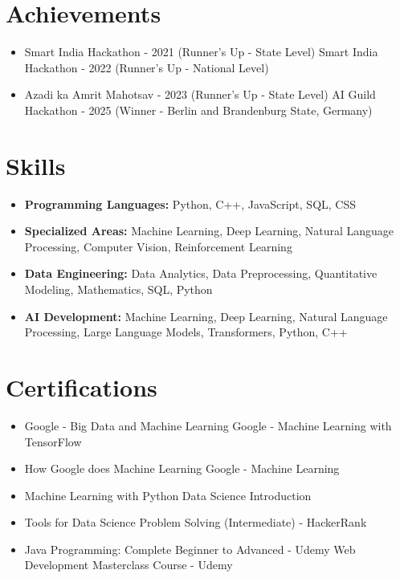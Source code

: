 \documentclass[a4paper,10pt]{article}
\begin{document}
\section*{Achievements}
\begin{itemize}
\item Smart India Hackathon - 2021 (Runner's Up - State Level) \hfill Smart India Hackathon - 2022 (Runner's Up - National Level)
\item Azadi ka Amrit Mahotsav - 2023 (Runner's Up - State Level) \hfill AI Guild Hackathon - 2025 (Winner - Berlin and Brandenburg State, Germany)
\end{itemize}

\section*{Skills}
\begin{itemize}
  \item \textbf{Programming Languages:} Python, C++, JavaScript, SQL, CSS
  \item \textbf{Specialized Areas:} Machine Learning, Deep Learning, Natural Language Processing, Computer Vision, Reinforcement Learning
  \item \textbf{Data Engineering:} Data Analytics, Data Preprocessing, Quantitative Modeling, Mathematics, SQL, Python
  \item \textbf{AI Development:} Machine Learning, Deep Learning, Natural Language Processing, Large Language Models, Transformers, Python, C++
\end{itemize}

\section*{Certifications}
\begin{itemize}
\item Google - Big Data and Machine Learning \hfill Google - Machine Learning with TensorFlow
\item How Google does Machine Learning \hfill Google - Machine Learning
\item Machine Learning with Python \hfill Data Science Introduction
\item Tools for Data Science \hfill Problem Solving (Intermediate) - HackerRank
\item Java Programming: Complete Beginner to Advanced - Udemy \hfill Web Development Masterclass Course - Udemy
\end{itemize}
\end{document}
